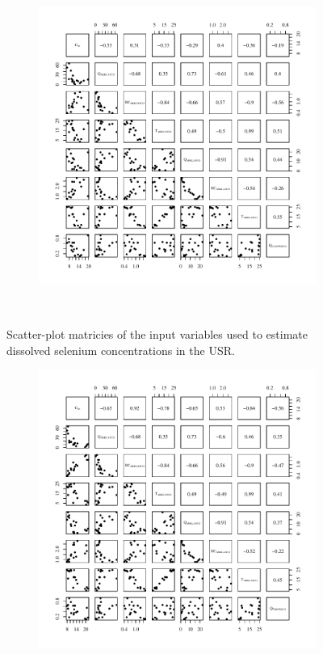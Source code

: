 \begin{linenumbers}
\begin{landscape}
\begin{figure}
\begin{subfigure}{0.7\textwidth}
			\centering			
			\includegraphics[width=\tableCustomSize]{"Figures/Results_USR/Stochastic/Conc Model Full PairsCAN"}
		\end{subfigure}\\
		\caption{Scatter-plot matricies of the input variables used to estimate dissolved selenium concentrations in the USR.}
	\end{figure}
\end{landscape}
\subfiguremid
\begin{landscape}
	\begin{figure}
		\begin{subfigure}{0.7\textwidth}
			\centering
			\includegraphics[width=\tableCustomSize]{"Figures/Results_USR/Stochastic/Conc Model Full PairsTIM"}

\end{subfigure}
\end{figure}
\end{landscape}
\end{linenumbers}
